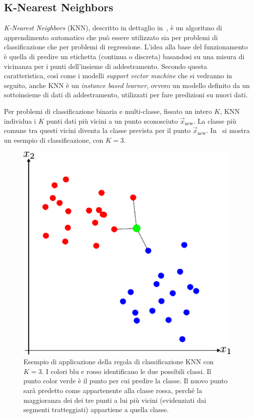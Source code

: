 \subsection{K-Nearest Neighbors}\label{sec:ml:knn}
\emph{K-Nearest Neighbors} (KNN), descritto in dettaglio in~\cite{KNN}, è un algoritmo di apprendimento automatico che può essere utilizzato sia per problemi di classificazione che  per problemi di regressione. 
L'idea alla base del funzionamento è quella di predire un etichetta (continua o discreta) basandosi su una misura di vicinanza per i punti dell'insieme di addestramento. 
Secondo questa caratteristica, così come i modelli \emph{support vector machine} che si vedranno in seguito, anche KNN è un \emph{instance based learner}, ovvero un modello definito da un sottoinsieme di dati di addestramento, utilizzati per fare predizioni su nuovi dati.

Per problemi di classificazione binaria e multi-classe, fissato un intero $K$, KNN individua i $K$ punti dati più vicini a un punto sconosciuto $\Vec{x}_\text{new}$. 
La classe più comune tra questi vicini diventa la classe prevista per il punto $\Vec{x}_\text{new}$. 
In~ si mostra un esempio di classificazione, con $K=3$.
\begin{figure}
    \centering
    \includegraphics[width=0.7\linewidth]{img/KNN.pdf}
    \caption{Esempio di applicazione della regola di classificazione KNN con $K=3$. I colori blu e rosso identificano le due possibili classi. Il punto color verde è il punto per cui predire la classe.
    Il nuovo punto sarà predetto come appartenente alla classe rossa, perché la maggioranza dei dei tre punti a lui più vicini (evidenziati dai segmenti tratteggiati) appartiene a quella classe.}
    \label{fig:knn_example}
\end{figure}

